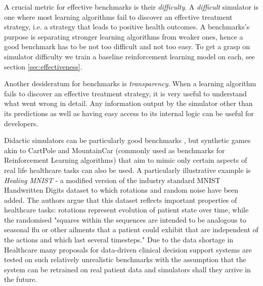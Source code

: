 A crucial metric for effective benchmarks is their \emph{difficulty}. 
A \emph{difficult} simulator is one where most learning algorithms fail to discover an effective treatment strategy, i.e. a strategy that leads to positive health outcomes.
A benchmarks's purpose is separating stronger learning algorithms from weaker ones, hence a good benchmark has to be not too difficult and not too easy.
To get a grasp on simulator difficulty we train a baseline reinforcement learning model on each, see section \ref{sec:effectiveness}.

Another desideratum for benchmarks is \emph{transparency}.
When a learning algorithm fails to discover an effective treatment strategy, it is very useful to understand what went wrong in detail.
Any information output by the simulator other than its predictions as well as having easy access to its internal logic can be useful for developers.

Didactic simulators can be particularly good benchmarks \cite{anthropodidactic}, but synthetic games akin to CartPole \cite{cartpole} and MountainCar \cite{mountaincar} (commonly used as benchmarks for Reinforcement Learning algorithms) that aim to mimic only certain aspects of real life healthcare tasks can also be used.
A particularly illustrative example is \emph{Healing MNIST} \cite{healing-mnist} - a modified version of the industry standard MNIST Handwritten Digits \cite{mnist} dataset to which rotations and random noise have been added.
The authors argue that this dataset reflects important properties of healthcare tasks: rotations represent evolution of patient state over time, while the randomised "squares within the sequences are intended to be analogous to seasonal flu or other ailments that a patient could exhibit that are independent of the actions and which last several timesteps."
Due to the data shortage in Healthcare many proposals for data-driven clinical decision support systems are tested on such relatively unrealistic benchmarks with the assumption that the system can be retrained on real patient data and simulators shall they arrive in the future.